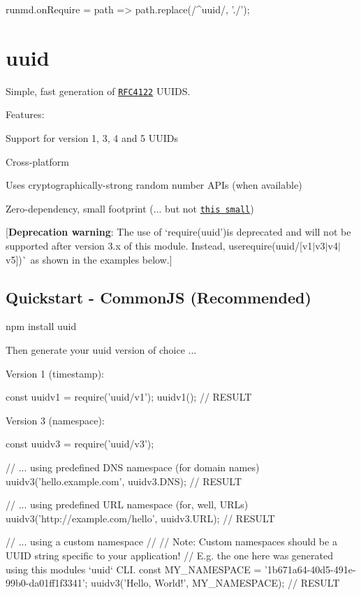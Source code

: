 
\begin{DoxyCode}
runmd.onRequire = path => path.replace(/^uuid/, './');
\end{DoxyCode}


\section*{uuid \href{http://travis-ci.org/kelektiv/node-uuid}{\tt }}

Simple, fast generation of \href{http://www.ietf.org/rfc/rfc4122.txt}{\tt R\+F\+C4122} U\+U\+I\+DS.

Features\+:


\begin{DoxyItemize}
\item Support for version 1, 3, 4 and 5 U\+U\+I\+Ds
\item Cross-\/platform
\item Uses cryptographically-\/strong random number A\+P\+Is (when available)
\item Zero-\/dependency, small footprint (... but not \href{https://gist.github.com/982883}{\tt this small})
\end{DoxyItemize}

\mbox{[}{\bfseries Deprecation warning}\+: The use of `require(\textquotesingle{}uuid'){\ttfamily is deprecated and will not be supported after version 3.\+x of this module. Instead, use}require(\textquotesingle{}uuid/\mbox{[}v1$\vert$v3$\vert$v4$\vert$v5\mbox{]}\textquotesingle{})\`{} as shown in the examples below.\mbox{]}

\subsection*{Quickstart -\/ Common\+JS (Recommended)}


\begin{DoxyCode}
npm install uuid
\end{DoxyCode}


Then generate your uuid version of choice ...

Version 1 (timestamp)\+:


\begin{DoxyCode}
const uuidv1 = require('uuid/v1');
uuidv1(); // RESULT
\end{DoxyCode}


Version 3 (namespace)\+:


\begin{DoxyCode}
const uuidv3 = require('uuid/v3');

// ... using predefined DNS namespace (for domain names)
uuidv3('hello.example.com', uuidv3.DNS); // RESULT

// ... using predefined URL namespace (for, well, URLs)
uuidv3('http://example.com/hello', uuidv3.URL); // RESULT

// ... using a custom namespace
//
// Note: Custom namespaces should be a UUID string specific to your application!
// E.g. the one here was generated using this modules `uuid` CLI.
const MY\_NAMESPACE = '1b671a64-40d5-491e-99b0-da01ff1f3341';
uuidv3('Hello, World!', MY\_NAMESPACE); // RESULT
\end{DoxyCode}



